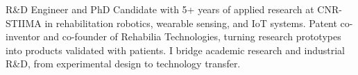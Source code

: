 {R\&D Engineer and PhD Candidate with 5+ years of applied research at CNR-STIIMA in rehabilitation robotics, wearable sensing, and IoT systems. Patent co-inventor and co-founder of Rehabilia Technologies, turning research prototypes into products validated with patients. I bridge academic research and industrial R\&D, from experimental design to technology transfer.}

